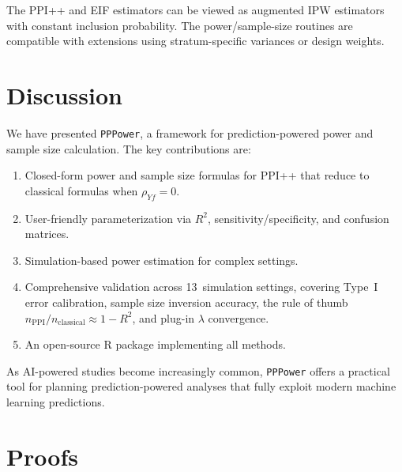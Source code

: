 \documentclass[11pt]{article}
\begin{document}
The PPI++ and EIF estimators can be viewed as augmented IPW estimators
with constant inclusion probability.  The power/sample-size routines
are compatible with extensions using stratum-specific variances or
design weights.

\section{Discussion}
\label{sec:discussion}

We have presented \texttt{PPPower}, a framework for prediction-powered
power and sample size calculation.  The key contributions are:
\begin{enumerate}
  \item Closed-form power and sample size formulas for PPI++ that reduce
    to classical formulas when $\rho_{Yf} = 0$.
  \item User-friendly parameterization via $R^2$,
    sensitivity/specificity, and confusion matrices.
  \item Simulation-based power estimation for complex settings.
  \item Comprehensive validation across 13~simulation settings, covering
    Type~I error calibration, sample size inversion accuracy, the rule
    of thumb $n_{\text{PPI}}/n_{\text{classical}} \approx 1-R^2$, and
    plug-in $\lambda$ convergence.
  \item An open-source R package implementing all methods.
\end{enumerate}

As AI-powered studies become increasingly common, \texttt{PPPower}
offers a practical tool for planning prediction-powered analyses that
fully exploit modern machine learning predictions.




\clearpage
\appendix

\section{Proofs}

\end{document}
